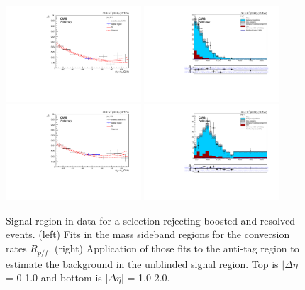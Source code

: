 \begin{figure}[h]
\centering
\includegraphics[width=0.45\textwidth]{F5/HH4b2p1SR_Fit_NRv1_unB1_boostres_dEta1.pdf}
\includegraphics[width=0.45\textwidth]{F5/HH4b2p1_Plot_NRv1_unB1_boostres_dEta1.pdf}\\
\includegraphics[width=0.45\textwidth]{F5/HH4b2p1SR_Fit_NRv1_unB1_boostres_dEta2.pdf}
\includegraphics[width=0.45\textwidth]{F5/HH4b2p1_Plot_NRv1_unB1_boostres_dEta2.pdf}
\caption{Signal region in data for a selection rejecting boosted and resolved events. (left) Fits in the mass sideband regions for the conversion rates $R_{p/f}$. (right) Application of those fits to the anti-tag region to estimate the background in the unblinded signal region. Top is $|\Delta\eta|$ = 0-1.0 and bottom is $|\Delta\eta|$ = 1.0-2.0.}
\label{fig:databoostres}
\end{figure}

